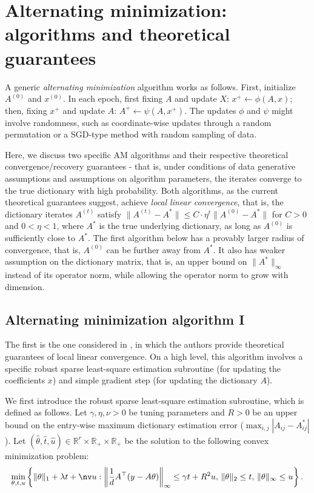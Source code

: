 \section{Alternating minimization: algorithms and theoretical guarantees}

A generic \textit{alternating minimization} algorithm works as follows. First, initialize $A^{(0)}$ and $x^{(0)}$. In each epoch, first fixing $A$ and update $X$: $x^+ \leftarrow \phi(A, x)$; then, fixing $x^+$ and update $A$: $A^+ \leftarrow \psi(A, x^+)$. The updates $\phi$ and $\psi$ might involve randomness, such as coordinate-wise updates through a random permutation or a SGD-type method with random sampling of data. 

Here, we discuss two specific AM algorithms and their respective theoretical convergence/recovery guarantees - that is, under conditions of data generative assumptions and assumptions on algorithm parameters, the iterates converge to the true dictionary with high probability. Both algorithms, as the current theoretical guarantees suggest, achieve \textit{local linear convergence}, that is, the dictionary iterates $A^{(t)}$ satisfy $\|A^{(t)} - A^*\| \leq C \cdot \eta^t \|A^{(0)} - A^*\|$ for $C>0$ and $0<\eta<1$, where $A^*$ is the true underlying dictionary, as long as $A^{(0)}$ is sufficiently close to $A^*$. The first algorithm below has a provably larger radius of convergence, that is, $A^{(0)}$ can be further away from $A^*$. It also has weaker assumption on the dictionary matrix, that is, an upper bound on $\|A^*\|_\infty$ instead of its operator norm, while allowing the operator norm to grow with dimension. 

\subsection{Alternating minimization algorithm I}
The first is the one considered in \cite{chatterji2017alternating}, in which the authors provide theoretical guarantees of local linear convergence. On a high level, this algorithm involves a specific robust sparse least-square estimation subroutine (for updating the coefficients $x$) and simple gradient step (for updating the dictionary $A$).

We first introduce the robust sparse least-square estimation subroutine, which is defined as follows. Let $\gamma, \eta, \nu > 0$ be tuning parameters and $R>0$ be an upper bound on the entry-wise maximum dictionary estimation error ($\max_{i,j} |A_{ij} - A^*_{ij}|$). Let $(\hat{\theta}, \hat{t}, \hat{u})\in \mathbb{R}^r \times \mathbb{R}_+\times \mathbb{R}_+$ be the solution to the following convex minimization problem: 
\begin{align}
    \min_{\theta,t,u}\left\{ \|\theta\|_1 + \lambda t + \nv u : \left\|\frac{1}{d} A^\top (y- A\theta) \right\|_\infty\leq \gamma t + R^2 u,\, \|\theta\|_2 \leq t,\, \|\theta\|_\infty\leq u \right\}. \label{eq:mu-selector}
\end{align}


